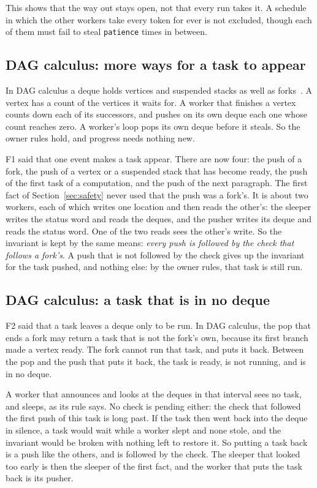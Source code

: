 \documentclass[sigplan,nonacm]{acmart}
\begin{document}
This shows that the way out stays open, not that every run takes it.
%
A schedule in which the other workers take every token for ever is
not excluded, though each of them must fail to steal
\lstinline|patience| times in between.

\subsection{DAG calculus: more ways for a task to appear}

In DAG calculus a deque holds vertices and suspended stacks as well
as forks~\cite{dagcalculus}.
%
A vertex has a count of the vertices it waits for.
%
A worker that finishes a vertex counts down each of its successors,
and pushes on its own deque each one whose count reaches zero.
%
A worker's loop pops its own deque before it steals.
%
So the owner rules hold, and progress needs nothing new.

F1 said that one event makes a task appear.
%
There are now four: the push of a fork, the push of a vertex or a
suspended stack that has become ready, the push of the first task of
a computation, and the push of the next paragraph.
%
The first fact of Section~\ref{sec:safety} never used that the push
was a fork's.
%
It is about two workers, each of which writes one location and then
reads the other's: the sleeper writes the status word and reads the
deques, and the pusher writes its deque and reads the status word.
%
One of the two reads sees the other's write.
%
So the invariant is kept by the same means: \emph{every push is
followed by the check that follows a fork's}.
%
A push that is not followed by the check gives up the invariant for
the task pushed, and nothing else: by the owner rules, that task is
still run.

\subsection{DAG calculus: a task that is in no deque}

F2 said that a task leaves a deque only to be run.
%
In DAG calculus, the pop that ends a fork may return a task that is
not the fork's own, because its first branch made a vertex ready.
%
The fork cannot run that task, and puts it back.
%
Between the pop and the push that puts it back, the task is ready,
is not running, and is in no deque.

A worker that announces and looks at the deques in that interval sees
no task, and sleeps, as its rule says.
%
No check is pending either: the check that followed the first push of
this task is long past.
%
If the task then went back into the deque in silence, a task would
wait while a worker slept and none stole, and the invariant would be
broken with nothing left to restore it.
%
So putting a task back is a push like the others, and is followed by
the check.
%
The sleeper that looked too early is then the sleeper of the first
fact, and the worker that puts the task back is its pusher.
\end{document}
